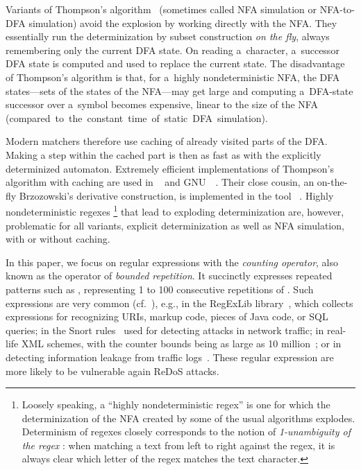 \documentclass[acmsmall,screen]{acmart}
\begin{document}
Variants of Thompson's algorithm~\cite{thompsonmatching} (sometimes called NFA simulation or NFA-to-DFA simulation)
avoid the explosion by working directly with the NFA. They essentially run the
determinization by subset construction \emph{on the fly}, 
always remembering only the current DFA state.
On reading a~character, a~successor DFA state is computed and used to replace
the current state.
The disadvantage of Thompson's algorithm is that, for a~highly nondeterministic
NFA, the DFA states---sets of the states of the NFA---may get large and computing
a~DFA-state successor over a~symbol becomes expensive, linear to the size of
the NFA \mbox{(compared to the constant time of static DFA simulation).}

Modern matchers therefore use caching of already visited parts of the 
DFA.
Making a step within the cached part is then as fast as with the explicitly determinized automaton.
%
Extremely efficient implementations of Thompson's algorithm with caching are used in
\retwo~\cite{re2} and GNU~\grep~\cite{grep}.
Their close cousin, an on-the-fly Brzozowski's derivative construction, is
implemented in the tool \srm~\cite{VSXW19}.
%
Highly nondeterministic regexes%
\footnote{
Loosely speaking, 
a ``highly nondeterministic regex'' is one for which the determinization of the
NFA created by some of the usual algorithms explodes. Determinism of regexes
closely corresponds to the notion of \emph{1-unambiguity of the regex} \cite{BW98,Hovland09}: when matching a text from left to right against the regex, it is always clear which letter of the regex matches the text character. 
}
 that lead to exploding determinization are, however, problematic for all variants, explicit determinization as well as NFA simulation, with or without caching.
%

In this paper, we focus on regular expressions with
%
the \emph{counting operator}, also known as the operator of \emph{bounded repetition}. 
%
It succinctly expresses repeated patterns such as ,
representing 1 to 100 consecutive repetitions of .
%
Such expressions are very common (cf.~\cite{cikm15}), e.g., in the RegExLib
library~\cite{regexlib}, which collects expressions for recognizing URIs, markup
code, pieces of Java code, or SQL queries; in the Snort rules~\cite{snort} used
for detecting attacks in network traffic; in real-life XML schemes, with the
counter bounds being as large as 10 million~\cite{cikm15};
%
or in detecting information leakage from traffic
logs~\cite{aplas19}. 
%
These regular expression are more likely to be vulnerable again ReDoS attacks.
\end{document}
